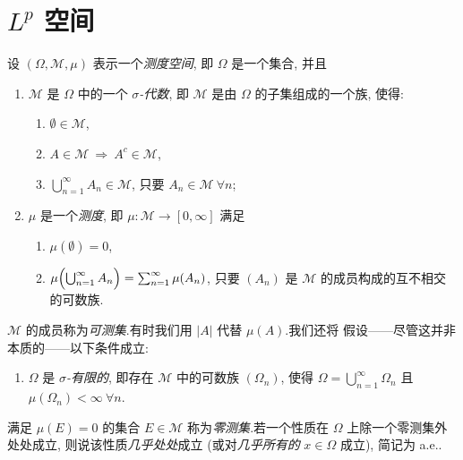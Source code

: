 
\chapter{$L^p$ 空间}
\label{chap:4}

设 $(\Omega,\mathcal{M},\mu)$ 表示一个\emph{测度空间}, 即 $\Omega$ 是一个集合, 并且

\begin{enumerate}[label=(\roman*), leftmargin=2.6em, itemsep=0.25em]
	\item $\mathcal{M}$ 是 $\Omega$ 中的一个 \emph{$\sigma$-代数}, 即 $\mathcal{M}$ 是由
	      $\Omega$ 的子集组成的一个族, 使得:
	      \begin{enumerate}[label=(\alph*), leftmargin=2.4em, itemsep=0.15em]
	      	\item $\emptyset\in\mathcal{M}$,
	      	\item $A\in\mathcal{M}\ \Rightarrow\ A^c\in\mathcal{M}$,
	      	\item $\bigcup_{n=1}^\infty A_n\in\mathcal{M}$, 只要 $A_n\in\mathcal{M}\ \forall n$;
	      \end{enumerate}
	\item $\mu$ 是一个\emph{测度}, 即 $\mu:\mathcal{M}\to[0,\infty]$ 满足
	      \begin{enumerate}[label=(\alph*), leftmargin=2.4em, itemsep=0.15em]
	      	\item $\mu(\emptyset)=0$,
	      	\item $\mu\Bigl(\bigcup_{n=1}^\infty A_n\Bigr)=\sum_{n=1}^\infty\mu(A_n)$,
	      	      只要 $(A_n)$ 是 $\mathcal{M}$ 的成员构成的互不相交的可数族.
	      \end{enumerate}
\end{enumerate}

$\mathcal{M}$ 的成员称为\emph{可测集}.有时我们用 $|A|$ 代替 $\mu(A)$.我们还将
假设——尽管这并非本质的——以下条件成立:

\begin{enumerate}[label=(\roman*), leftmargin=2.6em, start=3, itemsep=0.25em]
	\item $\Omega$ 是 \emph{$\sigma$-有限的}, 即存在 $\mathcal{M}$ 中的可数族
	      $(\Omega_n)$, 使得 $\Omega=\bigcup_{n=1}^\infty\Omega_n$ 且
	      $\mu(\Omega_n)<\infty\ \forall n$.
\end{enumerate}

满足 $\mu(E)=0$ 的集合 $E\in\mathcal{M}$ 称为\emph{零测集}.若一个性质在 $\Omega$
上除一个零测集外处处成立, 则说该性质\emph{几乎处处}成立 (或对\emph{几乎所有的}
$x\in\Omega$ 成立), 简记为 a.e..

